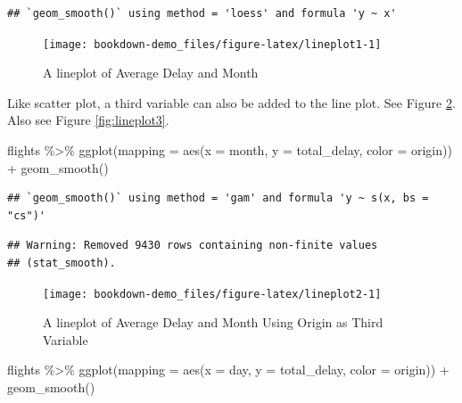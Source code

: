 \documentclass[
]{book}
\newenvironment{Shaded}{\begin{snugshade}}{\end{snugshade}}
\newcommand{\AttributeTok}[1]{\textcolor[rgb]{0.77,0.63,0.00}{#1}}
\newcommand{\FunctionTok}[1]{\textcolor[rgb]{0.00,0.00,0.00}{#1}}
\newcommand{\NormalTok}[1]{#1}
\newcommand{\SpecialCharTok}[1]{\textcolor[rgb]{0.00,0.00,0.00}{#1}}
\begin{document}
\begin{verbatim}
## `geom_smooth()` using method = 'loess' and formula 'y ~ x'
\end{verbatim}

\begin{figure}

{\centering \texttt{[image: bookdown-demo\_files/figure-latex/lineplot1-1]} 

}

\caption{A lineplot of Average Delay and Month}\label{fig:lineplot1}
\end{figure}

Like scatter plot, a third variable can also be added to the line plot. See Figure \ref{fig:lineplot2}. Also see Figure \ref{fig:lineplot3}.

\begin{Shaded}
\begin{Highlighting}[]
\NormalTok{flights }\SpecialCharTok{\%\textgreater{}\%} 
  \FunctionTok{ggplot}\NormalTok{(}\AttributeTok{mapping =} \FunctionTok{aes}\NormalTok{(}\AttributeTok{x =}\NormalTok{ month, }\AttributeTok{y =}\NormalTok{ total\_delay, }\AttributeTok{color =}\NormalTok{ origin)) }\SpecialCharTok{+} 
  \FunctionTok{geom\_smooth}\NormalTok{()}
\end{Highlighting}
\end{Shaded}

\begin{verbatim}
## `geom_smooth()` using method = 'gam' and formula 'y ~ s(x, bs = "cs")'
\end{verbatim}

\begin{verbatim}
## Warning: Removed 9430 rows containing non-finite values
## (stat_smooth).
\end{verbatim}

\begin{figure}

{\centering \texttt{[image: bookdown-demo\_files/figure-latex/lineplot2-1]} 

}

\caption{A lineplot of Average Delay and Month Using Origin as Third Variable}\label{fig:lineplot2}
\end{figure}

\begin{Shaded}
\begin{Highlighting}[]
\NormalTok{flights }\SpecialCharTok{\%\textgreater{}\%} 
  \FunctionTok{ggplot}\NormalTok{(}\AttributeTok{mapping =} \FunctionTok{aes}\NormalTok{(}\AttributeTok{x =}\NormalTok{ day, }\AttributeTok{y =}\NormalTok{ total\_delay, }\AttributeTok{color =}\NormalTok{ origin)) }\SpecialCharTok{+} 
  \FunctionTok{geom\_smooth}\NormalTok{()}
\end{Highlighting}
\end{Shaded}
\end{document}
